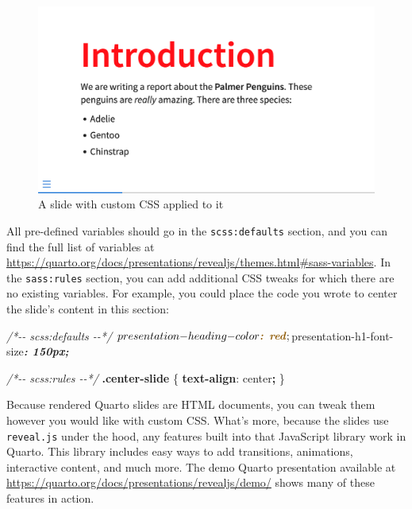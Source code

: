 \documentclass[
]{book}
\newenvironment{Shaded}{\begin{snugshade}}{\end{snugshade}}
\newcommand{\CommentTok}[1]{\textcolor[rgb]{0.56,0.35,0.01}{\textit{#1}}}
\newcommand{\DecValTok}[1]{\textcolor[rgb]{0.00,0.00,0.81}{#1}}
\newcommand{\FunctionTok}[1]{\textcolor[rgb]{0.13,0.29,0.53}{\textbf{#1}}}
\newcommand{\InformationTok}[1]{\textcolor[rgb]{0.56,0.35,0.01}{\textbf{\textit{#1}}}}
\newcommand{\KeywordTok}[1]{\textcolor[rgb]{0.13,0.29,0.53}{\textbf{#1}}}
\newcommand{\NormalTok}[1]{#1}
\newcommand{\OperatorTok}[1]{\textcolor[rgb]{0.81,0.36,0.00}{\textbf{#1}}}
\begin{document}
\begin{figure}
\includegraphics[width=1\linewidth]{assets/quarto-slide-scss} \caption{A slide with custom CSS applied to it}\label{fig:quarto-slide-scss}
\end{figure}

All pre-defined variables should go in the \texttt{scss:defaults} section, and you can find the full list of variables at \url{https://quarto.org/docs/presentations/revealjs/themes.html\#sass-variables}. In the \texttt{sass:rules} section, you can add additional CSS tweaks for which there are no existing variables. For example, you could place the code you wrote to center the slide's content in this section:

\begin{Shaded}
\begin{Highlighting}[]
\CommentTok{/*{-}{-} scss:defaults {-}{-}*/}
\NormalTok{$presentation{-}heading{-}color}\InformationTok{: red}\NormalTok{;}
\NormalTok{$presentation{-}h1{-}font{-}size}\InformationTok{: 150px;}

\CommentTok{/*{-}{-} scss:rules {-}{-}*/}
\FunctionTok{.center{-}slide}\NormalTok{ \{}
  \KeywordTok{text{-}align}\NormalTok{: }\DecValTok{center}\OperatorTok{;}
\NormalTok{\}}
\end{Highlighting}
\end{Shaded}

Because rendered Quarto slides are HTML documents, you can tweak them however you would like with custom CSS. What's more, because the slides use \texttt{reveal.js} under the hood, any features built into that JavaScript library work in Quarto. This library includes easy ways to add transitions, animations, interactive content, and much more. The demo Quarto presentation available at \url{https://quarto.org/docs/presentations/revealjs/demo/} shows many of these features in action.
\end{document}
